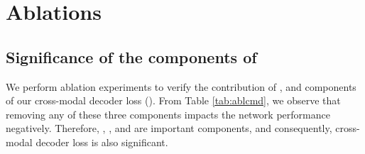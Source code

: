 \documentclass[10pt,twocolumn,letterpaper]{article}
\begin{document}
\section{Ablations}

\subsection{Significance of the components of }
We perform ablation experiments to verify the contribution of ,  and  components of our cross-modal decoder loss (). From Table \ref{tab:ablcmd}, we observe that removing any of these three components impacts the network performance negatively. Therefore, , , and  are important components, and consequently, cross-modal decoder loss is also significant.
  \begin{table}[t]
 \centering
{}
 \caption{Ablation study to verify the contribution of , ,  and  components of  on AVGZSLNet (eq wt) for generalized zero-shot classification (\% mAcc).}
 \label{tab:abltrip}
\vspace{-15pt}
 \end{table}
 
\end{document}
